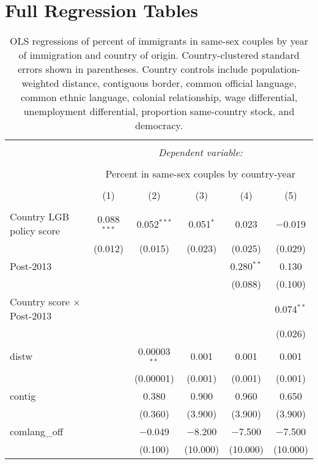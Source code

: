 \documentclass[
  11pt,
]{article}
\begin{document}
\newpage

\hypertarget{full-regression-tables}{%
\section{Full Regression Tables}\label{full-regression-tables}}

\begin{table}[!htbp] \centering 
  \caption{OLS regressions of percent of immigrants in same-sex couples by year of immigration and country of origin. Country-clustered standard errors shown in parentheses. Country controls include population-weighted distance, contiguous border, common official language, common ethnic language, colonial relationship, wage differential, unemployment differential, proportion same-country stock, and democracy.} 
  \label{tab:country-props-full} 
\begin{tabular}{@{\extracolsep{5pt}}lccccc} 
\\[-1.8ex]\hline 
\hline \\[-1.8ex] 
 & \multicolumn{5}{c}{\textit{Dependent variable:}} \\ 
\cline{2-6} 
\\[-1.8ex] & \multicolumn{5}{c}{Percent in same-sex couples by country-year} \\ 
\\[-1.8ex] & (1) & (2) & (3) & (4) & (5)\\ 
\hline \\[-1.8ex] 
 Country LGB policy score & 0.088$^{***}$ & 0.052$^{***}$ & 0.051$^{*}$ & 0.023 & $-$0.019 \\ 
  & (0.012) & (0.015) & (0.023) & (0.025) & (0.029) \\ 
  Post-2013 &  &  &  & 0.280$^{**}$ & 0.130 \\ 
  &  &  &  & (0.088) & (0.100) \\ 
  Country score × Post-2013 &  &  &  &  & 0.074$^{**}$ \\ 
  &  &  &  &  & (0.026) \\ 
  distw &  & 0.00003$^{**}$ & 0.001 & 0.001 & 0.001 \\ 
  &  & (0.00001) & (0.001) & (0.001) & (0.001) \\ 
  contig &  & 0.380 & 0.900 & 0.960 & 0.650 \\ 
  &  & (0.360) & (3.900) & (3.900) & (3.900) \\ 
  comlang\_off &  & $-$0.049 & $-$8.200 & $-$7.500 & $-$7.500 \\ 
  &  & (0.100) & (10.000) & (10.000) & (10.000) \\ 

\end{tabular}
\end{table}
\end{document}

